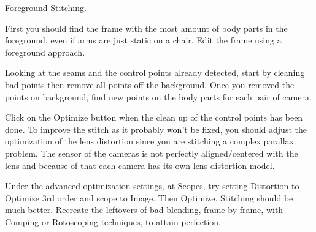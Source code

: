 \begin{fullwidth}


{\large Foreground Stitching. \par}

First you should find the frame with the most amount of body parts in the foreground, even if arms are just static on a chair. Edit the frame using a foreground approach.

Looking at the seams and the control points already detected, start by cleaning bad points then remove all points off the background. Once you removed the points on background, find new points on the body parts for each pair of camera.

Click on the Optimize button when the clean up of the control points has been done. To improve the stitch as it probably won’t be fixed, you should adjust the optimization of the lens distortion since you are stitching a complex parallax problem. The sensor of the cameras is not perfectly aligned/centered with the lens and because of that each camera has its own lens distortion model. 

Under the advanced optimization settings, at Scopes, try setting Distortion to Optimize 3rd order and scope to Image. Then Optimize. Stitching should be much better. Recreate the leftovers of bad blending, frame by frame, with Comping or Rotoscoping techniques, to attain perfection.

\clearpage
\end{fullwidth}